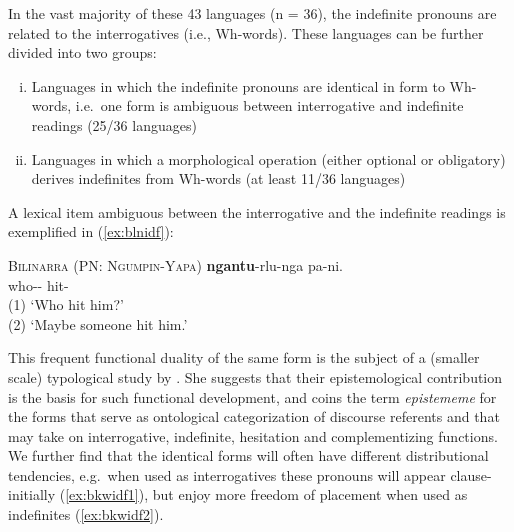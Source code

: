 \documentclass[12pt,egregdoesnotlikesansseriftitles]{scrartcl}
\begin{document}
In the vast majority of these 43 languages (n = 36), the indefinite pronouns are related to the interrogatives (i.e., Wh-words).
These languages can be further divided into two groups:
\begin{enumerate}[(i)]
\item Languages in which the indefinite pronouns are identical in form to Wh-words, i.e.\ one form is ambiguous between interrogative and indefinite readings (25/36 languages) %
\item Languages in which a morphological operation (either optional or obligatory) derives indefinites from Wh-words (at least 11/36 languages)
\end{enumerate}

A lexical item ambiguous between the interrogative and the indefinite readings is exemplified in (\ref{ex:blnidf}):
\begin{exe}
  \ex\label{ex:blnidf} \textsc{Bilinarra (PN: Ngumpin-Yapa)}\hfill {}
  \gll \textbf{ngantu}-rlu-nga pa-ni.\\
  who-\Erg-\Dub{} hit-\Pst{}\\
  \glt (1) `Who hit him?'\\
  (2) `Maybe someone hit him.'
\end{exe}

This frequent functional duality of the same form is the subject of a (smaller scale) typological study by \citet{mushin95}. She suggests that their epistemological contribution is the basis for such functional development, and coins the term \textit{epistememe} for the forms that serve as ontological categorization of discourse referents and that may take on interrogative, indefinite, hesitation and complementizing functions. We further find that the identical forms will often have different distributional tendencies, e.g.\ when used as interrogatives these pronouns will appear clause-initially (\ref{ex:bkwidf1}), but enjoy more freedom of placement when used as indefinites (\ref{ex:bkwidf2}).
\end{document}
